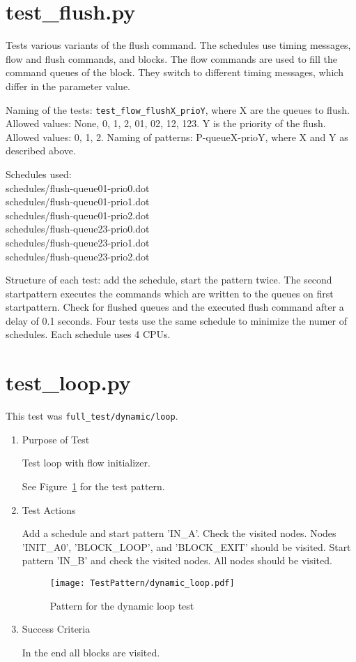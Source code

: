 \documentclass[12pt,a4paper]{report}
\begin{document}
\section{test\_flush.py}
Tests various variants of the flush command. The schedules use timing messages, flow and flush commands, and blocks.
The flow commands are used to fill the command queues of the block. They switch to different timing messages, which
differ in the parameter value.

Naming of the tests:
\texttt{test\_flow\_flushX\_prioY}, where
X are the queues to flush. Allowed values: None, 0, 1, 2, 01, 02, 12, 123.
Y is the priority of the flush. Allowed values: 0, 1, 2.
Naming of patterns:
P-queueX-prioY, where X and Y as described above.

Schedules used:\\
schedules/flush-queue01-prio0.dot\\
schedules/flush-queue01-prio1.dot\\
schedules/flush-queue01-prio2.dot\\
schedules/flush-queue23-prio0.dot\\
schedules/flush-queue23-prio1.dot\\
schedules/flush-queue23-prio2.dot

Structure of each test:
add the schedule, start the pattern twice. The second startpattern executes the commands which are written
to the queues on first startpattern.
Check for flushed queues and the executed flush command after a delay of 0.1 seconds.
Four tests use the same schedule to minimize the numer of schedules. Each schedule uses 4 CPUs.

\section{test\_loop.py}
This test was \texttt{full\_test/dynamic/loop}.
\begin{enumerate}
  \item Purpose of Test

        Test loop with flow initializer.

  See Figure~\ref{fig:Pattern_for_the_dynamic_loop_test} for the test pattern.
  \item Test Actions

        Add a schedule and start pattern 'IN\_A'. Check the visited nodes. Nodes 'INIT\_A0', 'BLOCK\_LOOP', and 'BLOCK\_EXIT'
        should be visited. Start pattern 'IN\_B' and check the visited nodes. All nodes should be visited.
    \begin{figure}
        \centering
        \texttt{[image: TestPattern/dynamic\_loop.pdf]}
        \caption{Pattern for the dynamic loop test}
        \label{fig:Pattern_for_the_dynamic_loop_test}
    \end{figure}
  \item Success Criteria

  In the end all blocks are visited.
\end{enumerate}
\end{document}
